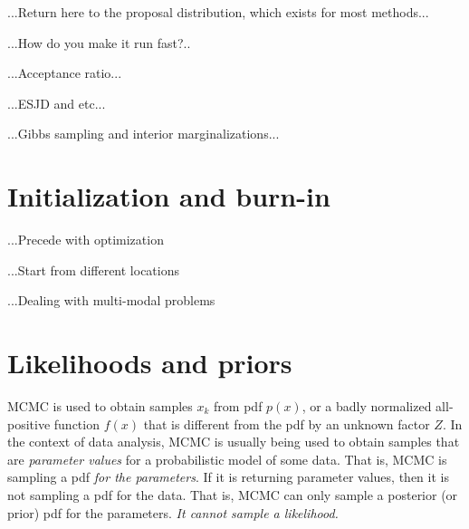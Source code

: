 \documentclass[12pt,twoside,pdftex]{article}
\begin{document}
...Return here to the proposal distribution, which exists for most methods...

...How do you make it run fast?..

...Acceptance ratio...

...ESJD and etc...


...Gibbs sampling and interior marginalizations...

\section{Initialization and burn-in}

...Precede with optimization

...Start from different locations

...Dealing with multi-modal problems

\section{Likelihoods and priors}

MCMC is used to obtain samples $x_k$ from pdf $p(x)$,
  or a badly normalized all-positive function $f(x)$
  that is different from the pdf by an unknown factor $Z$.
In the context of data analysis,
  MCMC is usually being used to obtain samples
  that are \emph{parameter values} for a probabilistic model of some data.
That is, MCMC is sampling a pdf \emph{for the parameters}.
If it is returning parameter values, then it is not sampling a pdf for the data.
That is, MCMC can only sample a posterior (or prior) pdf for the parameters.
\emph{It cannot sample a likelihood.}%
\end{document}
